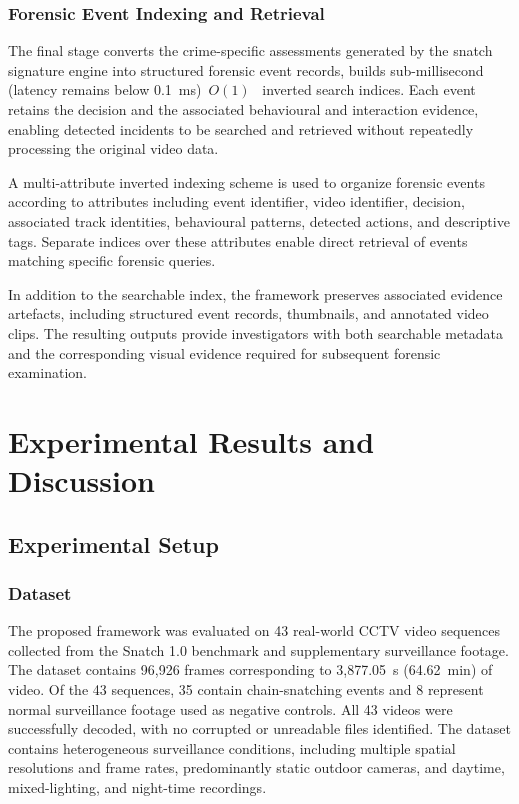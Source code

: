 \documentclass[runningheads]{llncs}
\begin{document}
\subsubsection{Forensic Event Indexing and Retrieval}

The final stage converts the crime-specific assessments generated by the
snatch signature engine into structured forensic event records, builds sub-millisecond (latency remains below 0.1~ms) $O(1)$   inverted search indices. Each
event retains the decision and the associated behavioural and interaction
evidence, enabling detected incidents to be searched and retrieved
without repeatedly processing the original video data.

A multi-attribute inverted indexing scheme is used to organize forensic
events according to attributes including event identifier, video
identifier, decision, associated track identities, behavioural patterns,
detected actions, and descriptive tags. Separate indices over these
attributes enable direct retrieval of events matching specific forensic
queries.

In addition to the searchable index, the framework preserves associated
evidence artefacts, including structured event records, thumbnails, and
annotated video clips. The resulting outputs provide investigators with
both searchable metadata and the corresponding visual evidence required
for subsequent forensic examination.

\section{Experimental Results and Discussion}
\subsection{Experimental Setup}

\subsubsection{Dataset}

The proposed framework was evaluated on 43 real-world CCTV video
sequences collected from the Snatch 1.0 benchmark and supplementary
surveillance footage. The dataset contains 96,926 frames corresponding
to 3,877.05~s (64.62~min) of video. Of the 43 sequences, 35 contain
chain-snatching events and 8 represent normal surveillance footage used
as negative controls. All 43 videos were successfully decoded, with no
corrupted or unreadable files identified. The dataset contains
heterogeneous surveillance conditions, including multiple spatial
resolutions and frame rates, predominantly static outdoor cameras, and
daytime, mixed-lighting, and night-time recordings.
\end{document}
